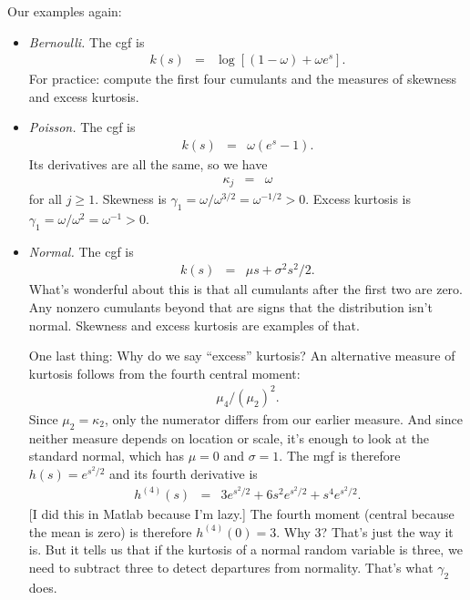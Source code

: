 \documentclass[11pt]{article}
\begin{document}
Our examples again:
%
\begin{itemize}
\item {\it Bernoulli.\/}
The cgf is
\begin{eqnarray*}
    k(s) &=& \log \left[ (1-\omega) + \omega e^{s} \right] .
\end{eqnarray*}
For practice:  compute the first four cumulants and the
measures of skewness and excess kurtosis.

\item {\it Poisson.\/}  The cgf is
\begin{eqnarray*}
    k(s) &=& \omega (e^{s}-1)  .
\end{eqnarray*}
Its derivatives are all the same, so we have
\begin{eqnarray*}
    \kappa_j &=& \omega
\end{eqnarray*}
for all $j\geq 1$.
Skewness is $\gamma_1 = \omega/\omega^{3/2} = \omega^{-1/2} > 0$.
Excess kurtosis is
$\gamma_1 = \omega/\omega^{2} = \omega^{-1} > 0$.


\item {\it Normal.\/}
The cgf is
\begin{eqnarray*}
        k(s) &=& \mu s + \sigma^2 s^2/2  .
\end{eqnarray*}
What's wonderful about this is that all cumulants after the first two are
zero.
Any nonzero cumulants beyond that are signs
that the distribution isn't normal.
Skewness and excess kurtosis are examples of that.

One last thing:  Why do we say ``excess'' kurtosis?
An alternative measure of kurtosis
follows from the fourth central moment:
\begin{eqnarray*}
    \mu_4 /(\mu_2)^2 .
\end{eqnarray*}
Since $\mu_2 = \kappa_2$, only the numerator differs
from our earlier measure.
And since neither measure depends on location or scale,
it's enough to look at the standard normal,
which has $\mu = 0$ and $\sigma = 1$.
The mgf is therefore $h(s) = e^{s^2/2}$ and its fourth derivative is
\begin{eqnarray*}
    h^{(4)}(s) &=& 3 e^{s^2/2} + 6 s^2 e^{s^2/2} + s^4 e^{s^2/2} .
\end{eqnarray*}
[I did this in Matlab because I'm lazy.]
The fourth moment (central because the mean is zero) is
therefore $ h^{(4)}(0) = 3$.
Why 3?  That's just the way it is.
But it tells us that if the kurtosis of a normal random variable is three,
we need to subtract three to detect departures from normality.
That's what $\gamma_2$ does.
\end{itemize}
\end{document}

